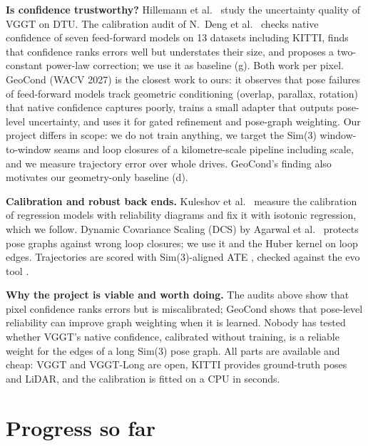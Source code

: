 \documentclass[11pt, a4paper]{article}
\begin{document}
\textbf{Is confidence trustworthy?} Hillemann et al.~\cite{hillemann} study the uncertainty quality of VGGT on DTU. The
calibration audit of N.~Deng et al.~\cite{dengaudit} checks native confidence of seven feed-forward models on 13 datasets
including KITTI, finds that confidence ranks errors well but understates their size, and proposes a two-constant power-law
correction; we use it as baseline (g). Both work per pixel. GeoCond \cite{geocond} (WACV 2027) is the closest work to ours:
it observes that pose failures of feed-forward models track geometric conditioning (overlap, parallax, rotation) that
native confidence captures poorly, trains a small adapter that outputs pose-level uncertainty, and uses it for gated
refinement and pose-graph weighting. Our project differs in scope: we do not train anything, we target the Sim(3)
window-to-window seams and loop closures of a kilometre-scale pipeline including scale, and we measure trajectory error
over whole drives. GeoCond's finding also motivates our geometry-only baseline (d).

\textbf{Calibration and robust back ends.} Kuleshov et al.~\cite{kuleshov} measure the calibration of regression models
with reliability diagrams and fix it with isotonic regression, which we follow. Dynamic Covariance Scaling (DCS) by
Agarwal et al.~\cite{dcs} protects pose graphs against wrong loop closures; we use it and the Huber kernel on loop edges.
Trajectories are scored with Sim(3)-aligned ATE \cite{umeyama, tum}, checked against the evo tool \cite{evo}.

\textbf{Why the project is viable and worth doing.} The audits above show that pixel confidence ranks errors but is
miscalibrated; GeoCond shows that pose-level reliability can improve graph weighting when it is learned. Nobody has
tested whether VGGT's native confidence, calibrated without training, is a reliable weight for the edges of a long
Sim(3) pose graph. All parts are available and cheap: VGGT and VGGT-Long are open, KITTI provides ground-truth poses
and LiDAR, and the calibration is fitted on a CPU in seconds.

\section{Progress so far}
\end{document}
